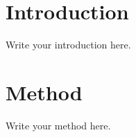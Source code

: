 \documentclass[a4paper,16pt,twoside]{book} %
\begin{document}
\sloppy  %

\frontmatter
\maketitle
\tableofcontents

\mainmatter  %

% 
% 


\chapter{Introduction}
Write your introduction here.

\chapter{Method}
Write your method here.



\end{document}
